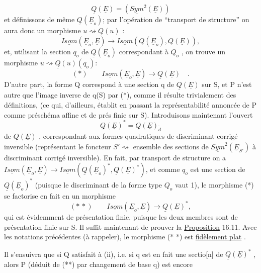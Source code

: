 
\[ \underline{Q}(\underline{E}) =(\underline{Sym}^2(\underline{E})) \]
et définissons de même $\underline{Q}(\underline{E}_o)$; par l'opération de ``transport de
structure'' on aura donc un morphisme $u \rightsquigarrow \underline{Q}(u)$ :
\[ \underline{Isom}(\underline{E}_o,\underline{E}) \longrightarrow \underline{Isom}(\underline{Q}(\underline{E}_o),\underline{Q}(\underline{E})), \]
et, utilisant la section $q_o$ de $\underline{Q}(\underline{E}_o)$ correspondant à $Q_o$ , on trouve un
morphisme $u \rightsquigarrow \underline{Q}(u)(q_o)$:
\[ (*) \qquad \underline{Isom}(\underline{E}_o,\underline{E}) \longrightarrow \underline{Q}(\underline{E}) \quad . \]
D'autre part, la forme Q  correspond à une section q de $\underline{Q}(\underline{E})$ sur S,
et P n'est autre que l'image inverse de q(S) par (*), comme il résulte
trivialement des définitions, (ce qui, d'ailleurs, établit en passant la
représentabilité annoncée de P comme préschéma affine et de prés finie
sur S). Introduisons maintenant l'ouvert 
\[ \underline{Q}(\underline{E})^* = \underline{Q}(\underline{E})_{\tilde{d}} \]
de $\underline{Q}(\underline{E})$ , correspondant aux formes quadratiques de discriminant corrigé
inversible (représentant le foncteur $S' \rightsquigarrow$ ensemble des 
sections de $\underline{Sym}^2(\underline{E}_{S'})$ à discriminant corrigé inversible). En fait,
par transport de structure on a $\underline{Isom}(\underline{E}_o,\underline{E}) \rightarrow \underline{Isom}(\underline{Q}(\underline{E}_o)^*,\underline{Q}(\underline{E})^*)$, et
comme $q_o$ est une section de $\underline{Q}(\underline{E}_o)^*$ (puisque le discriminant  de
la forme type $Q_o$ vaut 1), le morphisme (*) se factorise en fait en un
morphisme
\[ (*\,*) \qquad \underline{Isom}(\underline{E}_o,\underline{E}) \rightarrow \underline{Q}(\underline{E})^* , \]
qui est évidemment de présentation finie, puisque les deux membres sont de
présentation finie sur S. Il suffit maintenant de prouver la
 \uline{Proposition} 16.11. Avec les notations précédentes (à rappeler),
le morphisme (* *) est \uline{fidèlement plat} .

Il s'ensuivra que si Q satisfait à (ii), i.e. si q est en fait une sectio[n]
de $\underline{Q}(\underline{E})^*$\hand{\unsure{$\hat{}$}} , alors P (déduit de (**) par  changement de base q) est encore

